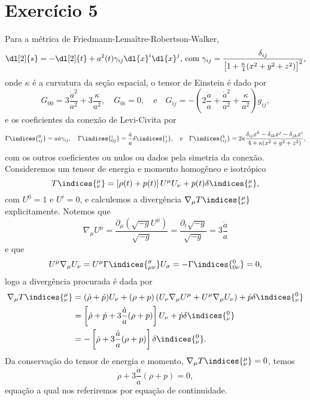 \section*{Exercício 5}
Para a métrica de Friedmann-Lemaître-Robertson-Walker,
\begin{equation*}
    \dl[2]{s} = -\dl[2]{t} + a^2(t) \gamma_{ij} \dl{x}^i\dl{x}^j\text{, com }\gamma_{ij} = \frac{\delta_{ij}}{\left[1 + \frac{\kappa}4(x^2 + y^2 + z^2)\right]^2},
\end{equation*}
onde \(\kappa\) é a curvatura da seção espacial, o tensor de Einstein é dado por
\begin{equation*}
    G_{00} = 3\frac{\dot{a}^2}{a^2} + 3\frac{\kappa}{a^2},\quad
    G_{0i} = 0,\quad\text{e}\quad
    G_{ij} = - \left(2 \frac{\ddot{a}}{a} + \frac{\dot{a}^2}{a^2} + \frac{\kappa}{a^2}\right)g_{ij},
\end{equation*}
e os coeficientes da conexão de Levi-Civita por
\begin{equation*}
    \Gamma\indices{^0_{ij}} = a\dot{a} \gamma_{ij},\quad
    \Gamma\indices{^i_{0j}} = \frac{\dot{a}}{a} \delta\indices{^i_j},\quad\text{e}\quad
    \Gamma\indices{^k_{ij}} = 2\kappa \frac{\delta_{ij}x^k - \delta_{ik}x^j - \delta_{jk}x^i}{4 + \kappa(x^2 + y^2 + z^2)},
\end{equation*}
com os outros coeficientes ou nulos ou dados pela simetria da conexão. Consideremos um tensor de energia e momento homogêneo e isotrópico
\begin{equation*}
    T\indices{^\mu_\nu} = \left[\rho(t) + p(t)\right] U^\mu U_\nu + p(t) \delta\indices{^\mu_\nu},
\end{equation*}
com \(U^0 = 1\) e \(U^i = 0\), e calculemos a divergência \(\nabla_\mu T\indices{^\mu_\nu}\) explicitamente. Notemos que
\begin{equation*}
    \nabla_\mu U^\mu = \frac{\partial_\mu (\sqrt{-g}U^\mu)}{\sqrt{-g}} = \frac{\partial_t\sqrt{-g}}{\sqrt{-g}} = 3\frac{\dot{a}}{a}
\end{equation*}
e que
\begin{equation*}
    U^\mu \nabla_\mu U_\nu = U^\mu \Gamma\indices{^\sigma_{\mu\nu}} U_\sigma = - \Gamma\indices{^0_{0\nu}} = 0,
\end{equation*}
logo a divergência procurada é dada por
\begin{align*}
    \nabla_\mu T\indices{^\mu_\nu} &= (\dot{\rho} + \dot{p})U_\nu + (\rho + p) \left(U_\nu \nabla_\mu U^\mu + U^\mu \nabla_\mu U_\nu\right) + \dot{p}\delta\indices{^0_\nu}\\
                                   &= \left[\dot\rho + \dot{p} + 3\frac{\dot{a}}{a}(\rho + p)\right]U_\nu + \dot{p} \delta\indices{^0_\nu}\\
                                   &= -\left[\dot\rho + 3\frac{\dot{a}}{a}(\rho + p)\right]\delta\indices{^0_\nu}.
\end{align*}
Da conservação do tensor de energia e momento, \(\nabla_\mu T\indices{^\mu_\nu} = 0\), temos
\begin{equation*}
    \dot{\rho} + 3\frac{\dot{a}}{a}(\rho + p) = 0,
\end{equation*}
equação a qual nos referiremos por equação de continuidade.



